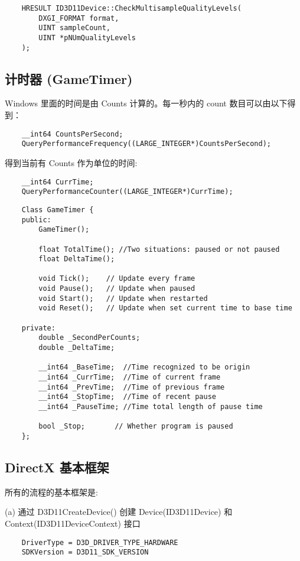 \documentclass[10pt, a4paper]{article}
\begin{document}
\begin{lstlisting}
    HRESULT ID3D11Device::CheckMultisampleQualityLevels(
        DXGI_FORMAT format, 
        UINT sampleCount, 
        UINT *pNUmQualityLevels
    );
\end{lstlisting}
    \subsection{计时器 (GameTimer)}
    Windows 里面的时间是由 Counts 计算的。每一秒内的 count 数目可以由以下得到：
\begin{lstlisting}
    __int64 CountsPerSecond; 
    QueryPerformanceFrequency((LARGE_INTEGER*)CountsPerSecond);
\end{lstlisting}

    得到当前有 Counts 作为单位的时间:
\begin{lstlisting}
    __int64 CurrTime; 
    QueryPerformanceCounter((LARGE_INTEGER*)CurrTime);
\end{lstlisting}

\begin{lstlisting}
    Class GameTimer {
    public: 
        GameTimer(); 

        float TotalTime(); //Two situations: paused or not paused
        float DeltaTime(); 

        void Tick();    // Update every frame
        void Pause();   // Update when paused
        void Start();   // Update when restarted
        void Reset();   // Update when set current time to base time 

    private: 
        double _SecondPerCounts; 
        double _DeltaTime;

        __int64 _BaseTime;  //Time recognized to be origin
        __int64 _CurrTime;  //Time of current frame
        __int64 _PrevTime;  //Time of previous frame 
        __int64 _StopTime;  //Time of recent pause
        __int64 _PauseTime; //Time total length of pause time 

        bool _Stop;       // Whether program is paused
    };
\end{lstlisting}

    \subsection{DirectX 基本框架} 
    所有的流程的基本框架是: 

        \quad(a) 通过 D3D11CreateDevice() 创建 Device(ID3D11Device) 和 Context(ID3D11DeviceContext) 接口
\begin{lstlisting}
    DriverType = D3D_DRIVER_TYPE_HARDWARE
    SDKVersion = D3D11_SDK_VERSION 
\end{lstlisting}
\end{document}
